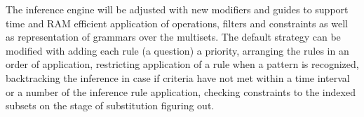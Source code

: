 \documentclass[runningheads]{llncs}
\begin{document}
The inference engine will be adjusted with new modifiers and guides to support time and RAM efficient application of operations, filters and constraints as well as representation of grammars over the multisets. The default strategy can be modified with adding each rule (a question) a priority, arranging the rules in an order of application, restricting application of a rule when a pattern is recognized, backtracking the inference in case if criteria have not met within a time interval or a number of the inference rule application, checking constraints to the indexed subsets on the stage of substitution figuring out.




\end{document}
